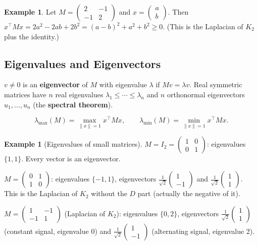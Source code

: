 \documentclass[12pt]{article}
\theoremstyle{definition}
\newtheorem{example}[theorem]{Example}
\theoremstyle{remark}
\begin{document}
\begin{example}
Let $M = \begin{pmatrix}2&-1\\-1&2\end{pmatrix}$ and $x = \begin{pmatrix}a\\b\end{pmatrix}$.
Then $x^\top M x = 2a^2 - 2ab + 2b^2 = (a-b)^2 + a^2 + b^2 \ge 0$.
(This is the Laplacian of $K_2$ plus the identity.)
\end{example}

\subsection{Eigenvalues and Eigenvectors}

$v \ne 0$ is an \textbf{eigenvector} of $M$ with eigenvalue $\lambda$ if $Mv = \lambda v$.
Real symmetric matrices have $n$ real eigenvalues $\lambda_1 \le \cdots \le \lambda_n$
and $n$ orthonormal eigenvectors $u_1, \ldots, u_n$ (the \textbf{spectral theorem}).

\[
  \lambda_{\max}(M) = \max_{\|x\|=1} x^\top M x, \qquad
  \lambda_{\min}(M) = \min_{\|x\|=1} x^\top M x.
\]

\begin{example}[Eigenvalues of small matrices]
$M = I_2 = \begin{pmatrix}1&0\\0&1\end{pmatrix}$: eigenvalues $\{1,1\}$.
Every vector is an eigenvector.

$M = \begin{pmatrix}0&1\\1&0\end{pmatrix}$: eigenvalues $\{-1,1\}$,
eigenvectors $\frac{1}{\sqrt2}\begin{pmatrix}1\\-1\end{pmatrix}$ and
$\frac{1}{\sqrt2}\begin{pmatrix}1\\1\end{pmatrix}$.
This is the Laplacian of $K_2$ without the $D$ part (actually the negative of it).

$M = \begin{pmatrix}1&-1\\-1&1\end{pmatrix}$ (Laplacian of $K_2$):
eigenvalues $\{0, 2\}$, eigenvectors $\frac{1}{\sqrt2}\begin{pmatrix}1\\1\end{pmatrix}$
(constant signal, eigenvalue 0) and $\frac{1}{\sqrt2}\begin{pmatrix}1\\-1\end{pmatrix}$
(alternating signal, eigenvalue 2).
\end{example}
\end{document}
